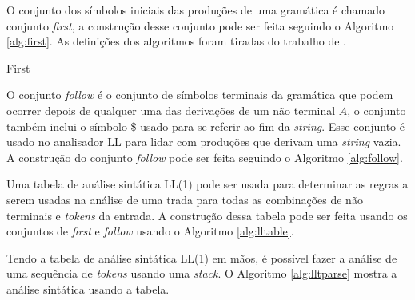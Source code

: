 O conjunto dos símbolos iniciais das produções de uma gramática é chamado conjunto \textit{first}, a construção desse conjunto pode ser feita seguindo o Algoritmo \ref{alg:first}. As definições dos algoritmos foram tiradas do trabalho de \textcite{thain2020introduction}.

\DontPrintSemicolon
{}
\begin{algorithm}[htp]
    \caption{First}\label{alg:first}
\end{algorithm}

O conjunto \textit{follow} é o conjunto de símbolos terminais da gramática que podem ocorrer depois de qualquer uma das derivações de um não terminal $A$, o conjunto também inclui o símbolo \$ usado para se referir ao fim da \textit{string}. Esse conjunto é usado no analisador LL para lidar com produções que derivam uma \textit{string} vazia. A construção do conjunto \textit{follow} pode ser feita seguindo o Algoritmo \ref{alg:follow}.

Uma tabela de análise sintática LL(1) pode ser usada para determinar as regras a serem usadas na análise de uma trada para todas as combinações de não terminais e \textit{tokens} da entrada. A construção dessa tabela pode ser feita usando os conjuntos de \textit{first} e \textit{follow} usando o Algoritmo \ref{alg:lltable}.

Tendo a tabela de análise sintática LL(1) em mãos, é possível fazer a análise de uma sequência de \textit{tokens} usando uma \textit{stack}. O Algoritmo \ref{alg:lltparse} mostra a análise sintática usando a tabela. 

